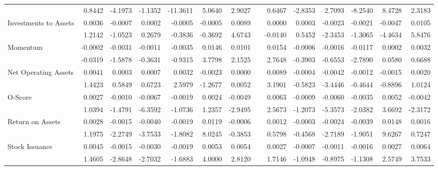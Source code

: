 \begin{table}[h]
{\begin{tabular}{lrrrrrrrrrrrrr}
& 0.8442 & -4.1973 & -1.1352 & -11.3611 & 5.0640 & 2.9027 &       & 0.6467 & -2.8353 & 2.7093 & -8.2540 & 8.4728 & 2.3183 \\
Investments to Assets & 0.0036 & -0.0007 & 0.0002 & -0.0005 & -0.0005 & 0.0089 &       & 0.0000 & 0.0003 & -0.0023 & -0.0021 & -0.0047 & 0.0105 \\
& 1.2142 & -1.0523 & 0.2679 & -0.3836 & -0.3692 & 4.6743 &       & -0.0140 & 0.5452 & -2.3453 & -1.3065 & -4.4634 & 5.8476 \\
Momentum & -0.0002 & -0.0031 & -0.0011 & -0.0035 & 0.0146 & 0.0101 &       & 0.0154 & -0.0006 & -0.0016 & -0.0117 & 0.0002 & 0.0032 \\
& -0.0319 & -1.5878 & -0.3631 & -0.9315 & 3.7798 & 2.1525 &       & 2.7648 & -0.3903 & -0.6553 & -2.7890 & 0.0580 & 0.6688 \\
Net Operating Assets & 0.0041 & 0.0003 & 0.0007 & 0.0032 & -0.0023 & 0.0000 &       & 0.0089 & -0.0004 & -0.0042 & -0.0012 & -0.0015 & 0.0020 \\
& 1.4423 & 0.5849 & 0.6723 & 2.5979 & -1.2677 & 0.0052 &       & 3.1901 & -0.5823 & -3.4446 & -0.4644 & -0.8896 & 1.0124 \\
O-Score & 0.0027 & -0.0010 & -0.0067 & -0.0019 & 0.0024 & -0.0049 &       & 0.0063 & -0.0009 & -0.0060 & -0.0035 & 0.0052 & -0.0042 \\
& 1.0394 & -1.4791 & -6.3592 & -1.0736 & 1.2357 & -2.9495 &       & 2.5673 & -1.2073 & -5.3573 & -2.0382 & 3.6692 & -2.3172 \\
Return on Assets & 0.0028 & -0.0015 & -0.0040 & -0.0019 & 0.0119 & -0.0006 &       & 0.0012 & -0.0003 & -0.0024 & -0.0039 & 0.0148 & 0.0016 \\
& 1.1975 & -2.2749 & -3.7533 & -1.8082 & 8.0245 & -0.3853 &       & 0.5798 & -0.4568 & -2.7189 & -1.9051 & 9.6267 & 0.7247 \\
Stock Issuance & 0.0045 & -0.0015 & -0.0030 & -0.0019 & 0.0053 & 0.0054 &       & 0.0027 & -0.0007 & -0.0011 & -0.0016 & 0.0027 & 0.0064 \\
& 1.4605 & -2.8648 & -2.7032 & -1.6883 & 4.0000 & 2.8120 &       & 1.7146 & -1.0948 & -0.8975 & -1.1308 & 2.5749 & 3.7533 \\
\bottomrule
\end{tabular}%
}
\label{tab:epu-ff5}%
\end{table}%


